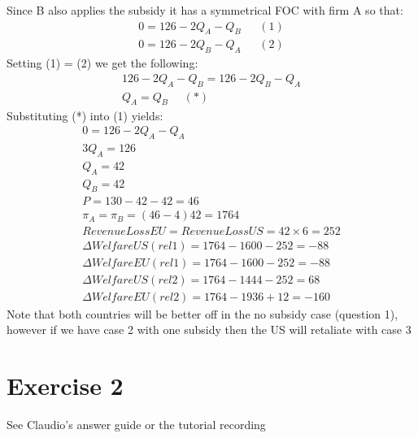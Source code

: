 \documentclass{article}
\begin{document}
Since B also applies the subsidy it has a symmetrical FOC with firm A so that:
\begin{gather*}
  0 = 126 - 2Q_{A} - Q_{B} \ \ \ \ \ \ \ (1) \\
  0 = 126 - 2Q_{B} - Q_{A} \ \ \ \ \ \ \ (2)
\end{gather*}
Setting (1) = (2) we get the following:
\begin{gather*}
  126 - 2Q_{A} - Q_{B} = 126 - 2Q_{B} - Q_{A} \\
  Q_{A} = Q_{B} \ \ \ \ \ \ (*)
\end{gather*}
Substituting (*) into (1) yields:
\begin{gather*}
  0 = 126 - 2Q_{A} - Q_{A} \\
  3Q_{A} = 126 \\
  Q_{A} = 42 \\
  Q_{B} = 42 \\
  P = 130 - 42 - 42 = 46 \\
  \pi_{A} = \pi_{B} = (46-4)42 = 1764  \\
  RevenueLossEU = RevenueLossUS = 42 \times 6 = 252 \\
  \Delta Welfare US (rel1) = 1764 - 1600 - 252 = - 88 \\
  \Delta Welfare EU (rel1) = 1764 - 1600 - 252 = - 88 \\
  \Delta Welfare US (rel2) = 1764 - 1444 - 252 = 68 \\
  \Delta Welfare EU (rel2) = 1764 - 1936 + 12 = -160
\end{gather*}
Note that both countries will be better off in the no subsidy case (question 1), however if we have case 2 with one subsidy then the US will retaliate with case 3


\section{Exercise 2}
\vspace{6mm}

See Claudio's answer guide or the tutorial recording
\end{document}
